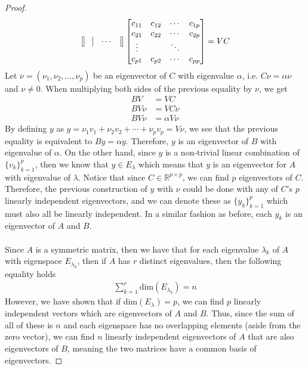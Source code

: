 \documentclass[10pt,a4paper]{article}
\theoremstyle{definition}
\theoremstyle{definition}
\numberwithin{equation}{section}
\begin{document}
\begin{proof}
\begin{align*}
\begin{bmatrix}
\vline & \vline & \cdots & \vline
\end{bmatrix} \begin{bmatrix}
c_{11} & c_{12} & \cdots & c_{1p}\\
c_{21} & c_{22} & \cdots & c_{2p}\\
\vdots& & \ddots\\
c_{p1} & c_{p2} & \cdots & c_{pp}
\end{bmatrix} = VC
\end{align*}
Let $\nu = (\nu_1, \nu_2, \ldots, \nu_p)$ be an eigenvector of $C$ with eigenvalue $\alpha$, i.e. $C \nu = \alpha \nu$ and $\nu \neq 0$. When multiplying both sides of the previous equality by $\nu$, we get
\begin{align*}
BV &= VC\\
BV\nu &= VC\nu\\
BV\nu &= \alpha V\nu
\end{align*}
By defining $y$ as $y = \nu_1 v_1 + \nu_2 v_2 + \cdots + \nu_p v_p = V\nu$, we see that the previous equality is equivalent to $By = \alpha y$. Therefore, $y$ is an eigenvector of $B$ with eigenvalue of $\alpha$. On the other hand, since $y$ is a non-trivial linear combination of $\{v_k\}_{k = 1}^p$, then we know that $y \in E_\lambda$ which means that $y$ is an eigenvector for $A$ with eigenvalue of $\lambda$. Notice that since $C \in \mathbb{R}^{p \times p}$, we can find $p$ eigenvectors of $C$. Therefore, the previous construction of $y$ with $\nu$ could be done with any of $C$'s $p$ linearly independent eigenvectors, and we can denote these as $\{y_k\}_{k = 1}^p$ which must also all be linearly independent. In a similar fashion as before, each $y_k$ is an eigenvector of $A$ and $B$. 
\\
\\Since $A$ is a symmetric matrix, then we have that for each eigenvalue $\lambda_k$ of $A$ with eigenspace $E_{\lambda_k}$, then if $A$ has $r$ distinct eigenvalues, then the following equality holds
\begin{align*}
\sum_{k = 1}^r \text{dim}(E_{\lambda_k}) = n
\end{align*}
However, we have shown that if dim$(E_\lambda) = p$, we can find $p$ linearly independent vectors which are eigenvectors of $A$ and $B$. Thus, since the sum of all of these is $n$ and each eigenspace has no overlapping elements (aside from the zero vector), we can find $n$ linearly independent eigenvectors of $A$ that are also eigenvectors of $B$, meaning the two matrices have a common basis of eigenvectors. 
\end{proof}
\end{document}
